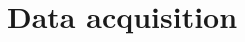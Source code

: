 \section{Data acquisition}

\begin{comment}

(1)

During the digital clock drawing test process, two individuals are involved, one is a patient and another acts as an instructor, who could be the doctor, nurse or any other employee of medical facility.
The iPad Pro together with an Apple Pencil are provided to the patient, then he is given short instructions about the tests and he may ask any questions about them. The instructor launches our application, enters the patient identification number, which is going to be used afterwards to match the data we have from the iPad application with the patient data provided to us by the clinicians offline.
After entering the patient identification number, the screen with the test selection is displayed, as shown on figure 2.2. The clinicians might configure this screen to show only certain tests. This screen also shows the progress of the same patient session to make it easier to track completed tests.

After selecting the clock test from the list of tests, or after completing the previous test and clicking the button ”next”, the clock drawing test screen is opened. This is simple empty screen with the buttons ”back” and ”next” on the status bar on the top of the screen. The empty area inside of the screen is for drawing.

Since the clock drawing test is one of the many tests performed during the medical screening not much of the attention is spent on it in particular. The patient is simply asked to draw a clock, he is not asked to draw the exact time.

After the test has been completed and the instructor will trigger the next one, the iPad will check whether the Internet is available and if it is, will convert the drawing data into JSON format and send the it directly to our servers. If the Internet is not available at the moment or if sending the data has failed, the data will be saved in the local storage of the iPad.

Every time the application is opened - it will check whether the Internet is available and if there are any unsynchronised tests, and will try to send them asynchronously in the background, hidden from the person using the application. If because of some reason sending data is not an option, it is possible to extract the data using the XCode application with developer’s provisional profile - which ensures that only the developers of the application has access to data.


\end{comment}

